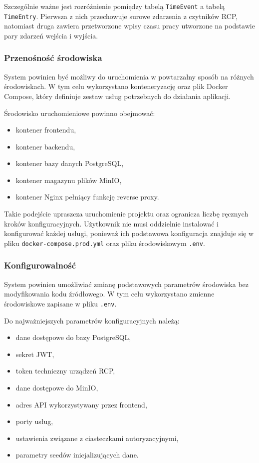 Szczególnie ważne jest rozróżnienie pomiędzy tabelą \texttt{TimeEvent} a tabelą \texttt{TimeEntry}. Pierwsza z nich przechowuje surowe zdarzenia z czytników RCP, natomiast druga zawiera przetworzone wpisy czasu pracy utworzone na podstawie pary zdarzeń wejścia i wyjścia.

\subsubsection{Przenośność środowiska}

System powinien być możliwy do uruchomienia w powtarzalny sposób na różnych środowiskach. W tym celu wykorzystano konteneryzację oraz plik Docker Compose, który definiuje zestaw usług potrzebnych do działania aplikacji.

Środowisko uruchomieniowe powinno obejmować:
\begin{itemize}
    \item kontener frontendu,
    \item kontener backendu,
    \item kontener bazy danych PostgreSQL,
    \item kontener magazynu plików MinIO,
    \item kontener Nginx pełniący funkcję reverse proxy.
\end{itemize}

Takie podejście upraszcza uruchomienie projektu oraz ogranicza liczbę ręcznych kroków konfiguracyjnych. Użytkownik nie musi oddzielnie instalować i konfigurować każdej usługi, ponieważ ich podstawowa konfiguracja znajduje się w pliku \texttt{docker-compose.prod.yml} oraz pliku środowiskowym \texttt{.env}.

\subsubsection{Konfigurowalność}

System powinien umożliwiać zmianę podstawowych parametrów środowiska bez modyfikowania kodu źródłowego. W tym celu wykorzystano zmienne środowiskowe zapisane w pliku \texttt{.env}.

Do najważniejszych parametrów konfiguracyjnych należą:
\begin{itemize}
    \item dane dostępowe do bazy PostgreSQL,
    \item sekret JWT,
    \item token techniczny urządzeń RCP,
    \item dane dostępowe do MinIO,
    \item adres API wykorzystywany przez frontend,
    \item porty usług,
    \item ustawienia związane z ciasteczkami autoryzacyjnymi,
    \item parametry seedów inicjalizujących dane.
\end{itemize}

